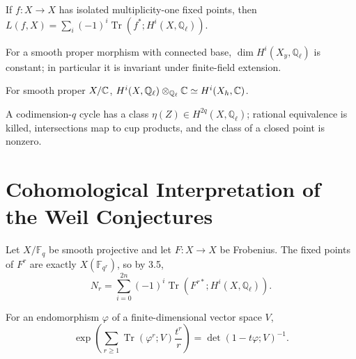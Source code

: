 \begin{convention}
\label{ha-appC-prop3-5}
If $f:X\to X$ has isolated multiplicity-one fixed points, then
$L(f,X)=\sum_i(-1)^i\operatorname{Tr}(f^*;H^i(X,\mathbb Q_\ell))$.
\end{convention}

\begin{convention}
\label{ha-appC-prop3-6}
For a smooth proper morphism with connected base, $\dim H^i(X_y,\mathbb Q_\ell)$
is constant; in particular it is invariant under finite-field extension.
\end{convention}

\begin{convention}
\label{ha-appC-prop3-7}
For smooth proper $X/\mathbb C$,
$H^i(X,\mathbb Q_\ell)\otimes_{\mathbb Q_\ell}\mathbb C\simeq H^i(X_h,\mathbb C)$.
\end{convention}

\begin{convention}
\label{ha-appC-prop3-8}
A codimension-$q$ cycle has a class $\eta(Z)\in H^{2q}(X,\mathbb Q_\ell)$;
rational equivalence is killed, intersections map to cup products, and the
class of a closed point is nonzero.
\end{convention}

\section{Cohomological Interpretation of the Weil Conjectures}
\label{ha-appC-sec4}

Let $X/\mathbb F_q$ be smooth projective and let $F:X\to X$ be Frobenius.
The fixed points of $F^r$ are exactly $X(\mathbb F_{q^r})$, so by 3.5,
\[
N_r=\sum_{i=0}^{2n}(-1)^i\operatorname{Tr}(F^{r*};H^i(X,\mathbb Q_\ell)).
\]

\begin{lemma}
\label{ha-appC-lem4-1}
For an endomorphism $\varphi$ of a finite-dimensional vector space $V$,
\[
\exp\left(\sum_{r\ge1}\operatorname{Tr}(\varphi^r;V)\frac{t^r}{r}\right)
=\det(1-t\varphi;V)^{-1}.
\]
\end{lemma}

